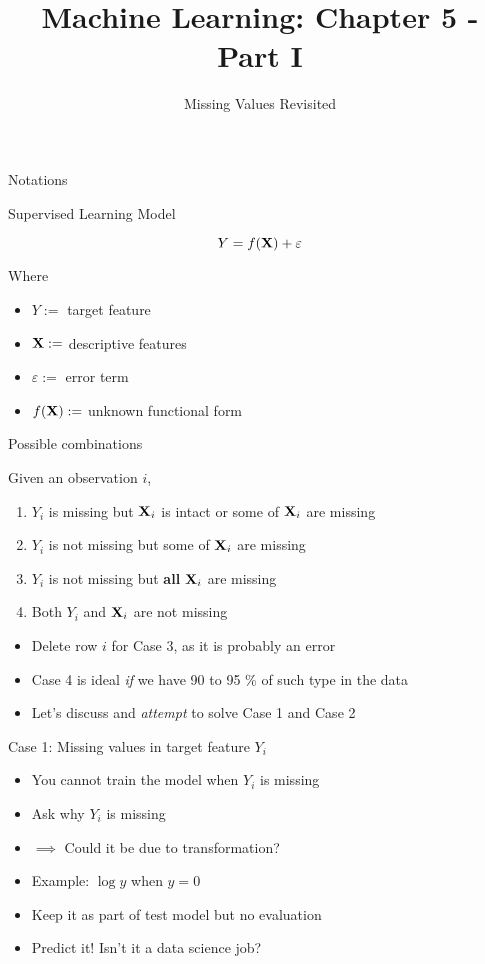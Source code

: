 \documentclass[ignorenonframetext,]{beamer}
\title{Machine Learning: Chapter 5 - Part I}
\subtitle{Missing Values Revisited}
\date{}
\providecommand{\tightlist}{%
  \setlength{\itemsep}{0pt}\setlength{\parskip}{0pt}}
\begin{document}
\frame{\titlepage}

\begin{frame}{Notations}

Supervised Learning Model

\[Y = f(\bold{X}) + \varepsilon\]

Where

\begin{itemize}
\tightlist
\item
  \(Y:=\) target feature
\item
  \(\bold{X}:=\) descriptive features
\item
  \(\varepsilon:=\) error term
\item
  \(f(\bold{X}):=\) unknown functional form
\end{itemize}

\end{frame}

\begin{frame}{Possible combinations}

Given an observation \(i\),

\begin{enumerate}
\def\labelenumi{\arabic{enumi}.}
\tightlist
\item
  \(Y_{i}\) is missing but \(\bold{X}_{i}\) is intact or some of
  \(\bold{X}_{i}\) are missing
\item
  \(Y_{i}\) is not missing but some of \(\bold{X}_{i}\) are missing
\item
  \(Y_{i}\) is not missing but \textbf{all} \(\bold{X}_{i}\) are missing
\item
  Both \(Y_{i}\) and \(\bold{X}_{i}\) are not missing
\end{enumerate}

\begin{itemize}
\tightlist
\item
  Delete row \(i\) for Case 3, as it is probably an error
\item
  Case 4 is ideal \emph{if} we have 90 to 95 \% of such type in the data
\item
  Let's discuss and \emph{attempt} to solve Case 1 and Case 2
\end{itemize}

\end{frame}

\begin{frame}{Case 1: Missing values in target feature \(Y_{i}\)}

\begin{itemize}
\tightlist
\item
  You cannot train the model when \(Y_{i}\) is missing
\item
  Ask why \(Y_{i}\) is missing
\item
  \(\implies\) Could it be due to transformation?
\item
  Example: \(\log{y}\) when \(y=0\)
\item
  Keep it as part of test model but no evaluation
\item
  Predict it! Isn't it a data science job?
\end{itemize}

\end{frame}
\end{document}
